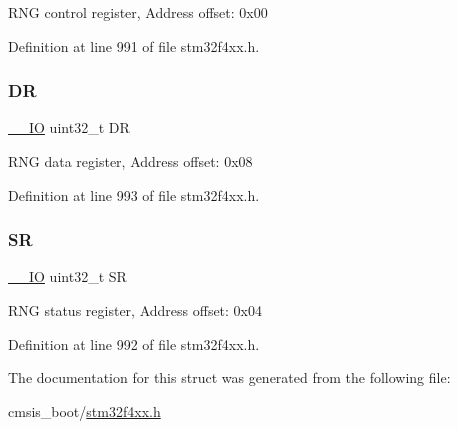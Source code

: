 R\+NG control register, Address offset\+: 0x00 

Definition at line 991 of file stm32f4xx.\+h.

\mbox{\label{struct_r_n_g___type_def_a3df0d8dfcd1ec958659ffe21eb64fa94}} 
\subsubsection{\texorpdfstring{DR}{DR}}
{\footnotesize\ttfamily \hyperlink{group___c_m_s_i_s__core__definitions_gaec43007d9998a0a0e01faede4133d6be}{\+\_\+\+\_\+\+IO} uint32\+\_\+t DR}

R\+NG data register, Address offset\+: 0x08 

Definition at line 993 of file stm32f4xx.\+h.

\mbox{\label{struct_r_n_g___type_def_af6aca2bbd40c0fb6df7c3aebe224a360}} 
\subsubsection{\texorpdfstring{SR}{SR}}
{\footnotesize\ttfamily \hyperlink{group___c_m_s_i_s__core__definitions_gaec43007d9998a0a0e01faede4133d6be}{\+\_\+\+\_\+\+IO} uint32\+\_\+t SR}

R\+NG status register, Address offset\+: 0x04 

Definition at line 992 of file stm32f4xx.\+h.



The documentation for this struct was generated from the following file\+:\begin{DoxyCompactItemize}
\item 
cmsis\+\_\+boot/\hyperlink{stm32f4xx_8h}{stm32f4xx.\+h}\end{DoxyCompactItemize}
